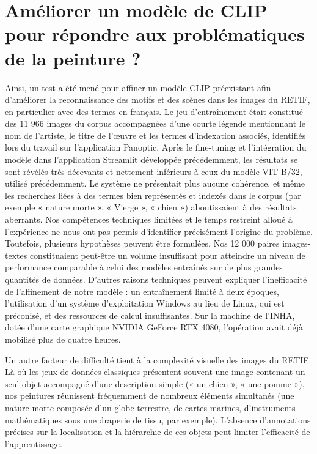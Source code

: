 \section[Amélioration de CLIP]{Améliorer un modèle de CLIP pour répondre aux problématiques de la peinture ?}

Ainsi, un test a été mené pour affiner un modèle CLIP préexistant afin d’améliorer la reconnaissance des motifs et des scènes dans les images du RETIF, en particulier avec des termes en français. Le jeu d’entraînement était constitué des 11 966 images du corpus accompagnées d’une courte légende mentionnant le nom de l’artiste, le titre de l’œuvre et les termes d’indexation associés, identifiés lors du travail sur l’application Panoptic. Après le fine-tuning et l’intégration du modèle dans l’application Streamlit développée précédemment, les résultats se sont révélés très décevants et nettement inférieurs à ceux du modèle VIT-B/32, utilisé précédemment. Le système ne présentait plus aucune cohérence, et même les recherches liées à des termes bien représentés et indexés dans le corpus (par exemple « nature morte », « Vierge », « chien ») aboutissaient à des résultats aberrants. Nos compétences techniques limitées et le temps restreint alloué à l’expérience ne nous ont pas permis d’identifier précisément l’origine du problème. Toutefois, plusieurs hypothèses peuvent être formulées. Nos 12 000 paires images-textes constituaient peut-être un volume insuffisant pour atteindre un niveau de performance comparable à celui des modèles entraînés sur de plus grandes quantités de données. D’autres raisons techniques peuvent expliquer l’inefficacité de l'affinement de notre modèle : un entraînement limité à deux époques, l’utilisation d’un système d’exploitation Windows au lieu de Linux, qui est préconisé, et des ressources de calcul insuffisantes. Sur la machine de l’INHA, dotée d’une carte graphique NVIDIA GeForce RTX 4080, l’opération avait déjà mobilisé plus de quatre heures.

Un autre facteur de difficulté tient à la complexité visuelle des images du RETIF. Là où les jeux de données classiques présentent souvent une image contenant un seul objet accompagné d’une description simple (« un chien », « une pomme »), nos peintures réunissent fréquemment de nombreux éléments simultanés (une nature morte composée d’un globe terrestre, de cartes marines, d’instruments mathématiques sous une draperie de tissu, par exemple). L’absence d’annotations précises sur la localisation et la hiérarchie de ces objets peut limiter l’efficacité de l’apprentissage.

